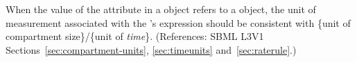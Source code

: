 When the value of the attribute  in a \RateRule object
refers to a \Compartment object, the unit of measurement associated with
the \RateRule's  expression should be consistent with \{unit of
compartment size\}/\{unit of \emph{time}\}.  (References: SBML L3V1
Sections~\ref{sec:compartment-units}, \ref{sec:timeunits}
and~\ref{sec:raterule}.)

